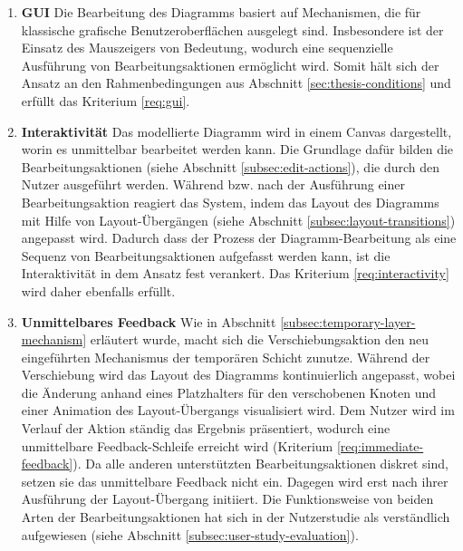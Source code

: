 \begin{enumerate}[label={K.\arabic*}]

\item
\label{eval:gui}
\textbf{GUI}
Die Bearbeitung des Diagramms basiert auf Mechanismen, die für klassische grafische Benutzeroberflächen ausgelegt sind. Insbesondere ist der Einsatz des Mauszeigers von Bedeutung, wodurch eine sequenzielle Ausführung von Bearbeitungsaktionen ermöglicht wird. Somit hält sich der Ansatz an den Rahmenbedingungen aus Abschnitt \ref{sec:thesis-conditions} und erfüllt das Kriterium \ref{req:gui}.

\item
\label{eval:interactivity}
\textbf{Interaktivität}
Das modellierte Diagramm wird in einem Canvas dargestellt, worin es unmittelbar bearbeitet werden kann. Die Grundlage dafür bilden die Bearbeitungsaktionen (siehe Abschnitt \ref{subsec:edit-actions}), die durch den Nutzer ausgeführt werden. Während bzw. nach der Ausführung einer Bearbeitungsaktion reagiert das System, indem das Layout des Diagramms mit Hilfe von Layout-Übergängen (siehe Abschnitt \ref{subsec:layout-transitions}) angepasst wird. Dadurch dass der Prozess der Diagramm-Bearbeitung als eine Sequenz von Bearbeitungsaktionen aufgefasst werden kann, ist die Interaktivität in dem Ansatz fest verankert. Das Kriterium \ref{req:interactivity} wird daher ebenfalls erfüllt.

\item
\label{eval:immediate-feedback}
\textbf{Unmittelbares Feedback}
Wie in Abschnitt \ref{subsec:temporary-layer-mechanism} erläutert wurde, macht sich die Verschiebungsaktion den neu eingeführten Mechanismus der temporären Schicht zunutze. Während der Verschiebung wird das Layout des Diagramms kontinuierlich angepasst, wobei die Änderung anhand eines Platzhalters für den verschobenen Knoten und einer Animation des Layout-Übergangs visualisiert wird. Dem Nutzer wird im Verlauf der Aktion ständig das Ergebnis präsentiert, wodurch eine unmittelbare Feedback-Schleife erreicht wird (Kriterium \ref{req:immediate-feedback}). Da alle anderen unterstützten Bearbeitungsaktionen diskret sind, setzen sie das unmittelbare Feedback nicht ein. Dagegen wird erst nach ihrer Ausführung der Layout-Übergang initiiert. Die Funktionsweise von beiden Arten der Bearbeitungsaktionen hat sich in der Nutzerstudie als verständlich aufgewiesen (siehe Abschnitt \ref{subsec:user-study-evaluation}).


\end{enumerate}

